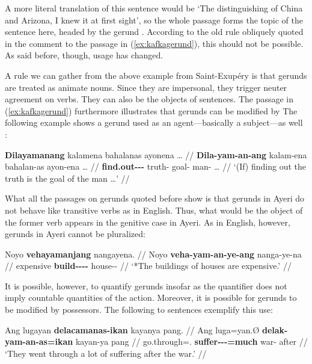 A more literal translation of this sentence would be `The distinguishing of 
China and Arizona, I knew it at first sight', so the whole passage 
 forms the topic of the 
sentence here, headed by the gerund 
. According to the old rule 
obliquely quoted in the comment to the passage in (\ref{ex:kafkagerund}), this 
should not be possible. As said before, though, usage has changed.

A rule we can gather from the above example from Saint-Exupéry is that gerunds 
are treated as animate nouns. Since they are impersonal, they trigger neuter 
agreement on verbs. They can also be the objects of sentences. The passage in 
(\ref{ex:kafkagerund}) furthermore illustrates that gerunds can be modified by 
The following example shows a gerund used as an agent---basically a 
subject---as well \citep{benung:scientificmethod}:

\ex\label{ex:scimethgerund}\begingl
	\gla \textbf{Dilayamanang} kalamena bahalanas ayonena … //
	\glb \textbf{Dila-yam-an-ang} kalam-ena bahalan-as ayon-ena … //
	\glc \textbf{find.out-\Ptcp{}-\Nmlz{}-\Aarg{}} truth-\Gen{} 
		goal-\Parg{} man-\Gen{} … //
	\glft `(If) finding out the truth is the goal of the man …' //
\endgl\xe

What all the passages on gerunds quoted before show is that gerunds in Ayeri 
do not behave like transitive verbs as in English. Thus, what would be the 
object of the former verb appears in the genitive case in Ayeri. As in English, 
however, gerunds in Ayeri cannot be pluralized:

\ex\ljudge* \begingl
	\gla Noyo \textbf{vehayamanjang} nangayena. //
	\glb Noyo \textbf{veha-yam-an-ye-ang} nanga-ye-na //
	\glc expensive \textbf{build-\Ptcp{}-\Nmlz{}-\Pl{}-\Aarg{}} 
		house-\Pl{}-\Gen{} //
	\glft `*The buildings of houses are expensive.' //
\endgl\xe

It is possible, however, to quantify gerunds insofar as the quantifier does not 
imply countable quantities of the action. Moreover, it is possible for gerunds 
to be modified by possessors. The following to sentences exemplify this use:

\ex\begingl
	\gla Ang lugayan \textbf{delacamanas-ikan} kayanya pang. //
	\glb Ang luga=yan.Ø \textbf{delak-yam-an-as=ikan} kayan-ya pang //
	\glc \AgtT{} go.through=\TplM{}.\Top{} 
		\textbf{suffer-\Ptcp{}-\Nmlz{}-\Parg{}=much} war-\Loc{} after //
	\glft `They went through a lot of suffering after the war.' //
\endgl\xe

